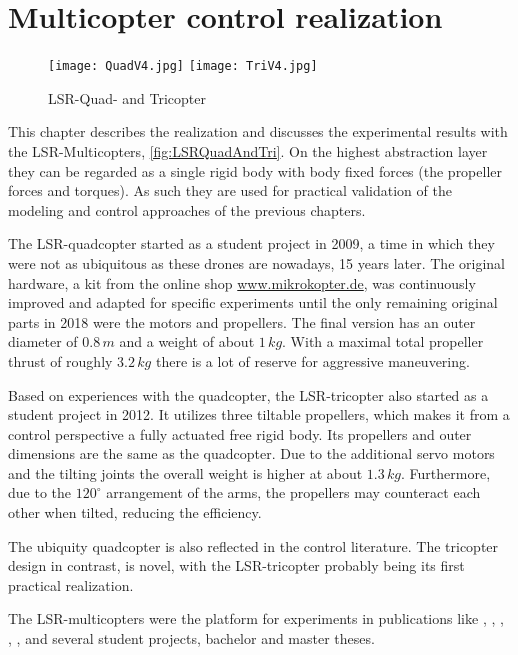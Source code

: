 \chapter{Multicopter control realization}\label{sec:MulticopterRealization}

\begin{figure}
 \centering
 \texttt{[image: QuadV4.jpg]}
 \hspace{.05\linewidth}
 \texttt{[image: TriV4.jpg]}
 \caption{LSR-Quad- and Tricopter}
 \label{fig:LSRQuadAndTri}
\end{figure}

This chapter describes the realization and discusses the experimental results with the LSR-Multicopters, \autoref{fig:LSRQuadAndTri}.
On the highest abstraction layer they can be regarded as a single rigid body with body fixed forces (the propeller forces and torques).
As such they are used for practical validation of the modeling and control approaches of the previous chapters.

The LSR-quadcopter started as a student project in 2009, a time in which they were not as ubiquitous as these drones are nowadays, 15 years later.
The original hardware, a kit from the online shop \url{www.mikrokopter.de}, was continuously improved and adapted for specific experiments until the only remaining original parts in 2018 were the motors and propellers.
The final version has an outer diameter of $0.8\,\unit{m}$ and a weight of about $1\,\unit{kg}$.
With a maximal total propeller thrust of roughly $3.2\,\unit{kg}$ there is a lot of reserve for aggressive maneuvering. 

Based on experiences with the quadcopter, the LSR-tricopter also started as a student project in 2012.
It utilizes three tiltable propellers, which makes it from a control perspective a fully actuated free rigid body.
Its propellers and outer dimensions are the same as the quadcopter.
Due to the additional servo motors and the tilting joints the overall weight is higher at about $1.3\,\unit{kg}$.
Furthermore, due to the $120^\circ$ arrangement of the arms, the propellers may counteract each other when tilted, reducing the efficiency.

The ubiquity quadcopter is also reflected in the control literature.
The tricopter design in contrast, is novel, with the LSR-tricopter probably being its first practical realization.  

The LSR-multicopters were the platform for experiments in publications like \cite{Kastelan:Tricopter}, \cite{Servais:Tricopter}, \cite{Servais:TricopterPendulumLoad}, \cite{Konz:Mechatronics}, \cite{Irscheid:HeavyRopesTricopter}, \cite{Konz:GaussTrackingControl} and several student projects, bachelor and master theses.
